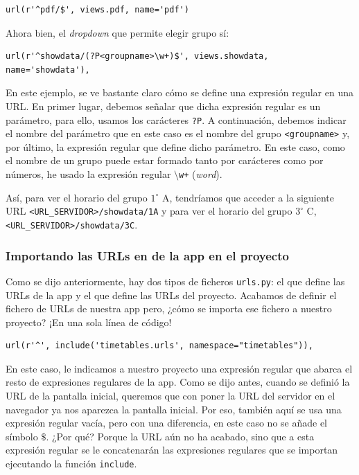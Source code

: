 \begin{verbatim}
url(r'^pdf/$', views.pdf, name='pdf')
\end{verbatim}

Ahora bien, el \textit{dropdown} que permite elegir grupo sí: 

\begin{verbatim}
url(r'^showdata/(?P<groupname>\w+)$', views.showdata, name='showdata'),
\end{verbatim}

En este ejemplo, se ve bastante claro cómo se define una expresión regular en una URL. En primer lugar, debemos señalar que dicha expresión regular es un parámetro, para ello, usamos los carácteres \texttt{?P}. A continuación, debemos indicar el nombre del parámetro que en este caso es el nombre del grupo \texttt{<groupname>} y, por último, la expresión regular que define dicho parámetro. En este caso, como el nombre de un grupo puede estar formado tanto por carácteres como por números, he usado la expresión regular \texttt{$\setminus$w+} (\textit{word}). 

Así, para ver el horario del grupo $1^{\circ}$ A, tendríamos que acceder a la siguiente URL \texttt{<URL\_SERVIDOR>/showdata/1A} y para ver el horario del grupo $3^{\circ}$ C, \texttt{<URL\_SERVIDOR>/showdata/3C}.

\subsubsection{Importando las URLs en de la app en el proyecto}
Como se dijo anteriormente, hay dos tipos de ficheros \texttt{urls.py}: el que define las URLs de la app y el que define las URLs del proyecto. Acabamos de definir el fichero de URLs de nuestra app pero, ¿cómo se importa ese fichero a nuestro proyecto? ¡En una sola línea de código!

\begin{verbatim}
url(r'^', include('timetables.urls', namespace="timetables")),
\end{verbatim}

En este caso, le indicamos a nuestro proyecto una expresión regular que abarca el resto de expresiones regulares de la app. Como se dijo antes, cuando se definió la URL de la pantalla inicial, queremos que con poner la URL del servidor en el navegador ya nos aparezca la pantalla inicial. Por eso, también aquí se usa una expresión regular vacía, pero con una diferencia, en este caso no se añade el símbolo $\$$. ¿Por qué? Porque la URL aún no ha acabado, sino que a esta expresión regular se le concatenarán las expresiones regulares que se importan ejecutando la función \texttt{include}. 

